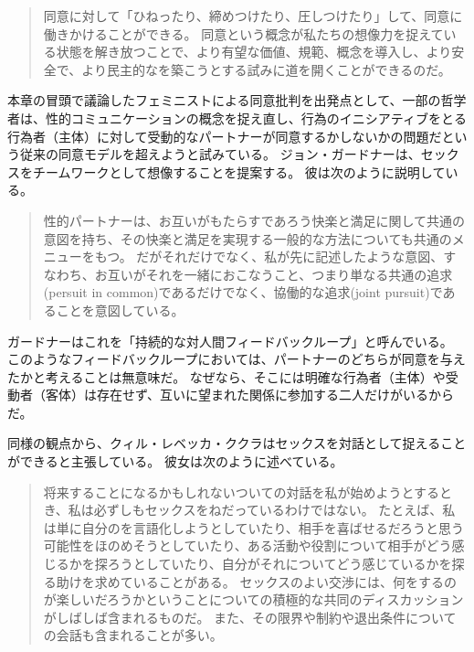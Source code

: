 \documentclass[paper=a4,book,openany]{jlreq}
\newcommand{\ig}[1]{}           %
\begin{document}
\begin{quote}
同意に対して「ひねったり、締めつけたり、圧しつけたり」して、同意に働きかけることができる。
同意という概念が私たちの想像力を捉えている状態を解き放つことで、より有望な価値、規範、概念を導入し、より安全で、より民主的なを築こうとする試みに道を開くことができるのだ。
\citep[p.3]{fischel18:screwconsent}
\end{quote}

本章の冒頭で議論したフェミニストによる同意批判を出発点として、一部の哲学者は、性的コミュニケーションの概念を捉え直し、行為のイニシアティブをとる行為者（主体）に対して受動的なパートナーが同意するかしないかの問題だという従来の同意モデルを超えようと試みている。
ジョン・ガードナーは、セックスをチームワークとして想像することを提案する。
彼は次のように説明している。

\begin{quote}
性的パートナーは、お互いがもたらすであろう快楽と満足に関して共通の意図を持ち、その快楽と満足を実現する一般的な方法についても共通のメニューをもつ。
だがそれだけでなく、私が先に記述したような意図、すなわち、お互いがそれを一緒におこなうこと、つまり単なる共通の追求(persuit in common)であるだけでなく、協働的な追求(joint pursuit)であることを意図している。
\citep[p.54]{gardner18:_oppos_rape}
\end{quote}

ガードナー\ig{Gardner}はこれを「持続的な対人間フィードバックループ」と呼んでいる\citep[p.55]{gardner18:_oppos_rape}。
このようなフィードバックループにおいては、パートナーのどちらが同意を与えたかと考えることは無意味だ。
なぜなら、そこには明確な行為者（主体）や受動者（客体）は存在せず、互いに望まれた関係に参加する二人だけがいるからだ。

同様の観点から、クィル・レベッカ・ククラはセックスを対話として捉えることができると主張している。
彼女は次のように述べている。

\begin{quote}
将来することになるかもしれないついての対話を私が始めようとするとき、私は必ずしもセックスをねだっているわけではない。
たとえば、私は単に自分のを言語化しようとしていたり、相手を喜ばせるだろうと思う可能性をほのめそうとしていたり、ある活動や役割について相手がどう感じるかを探ろうとしていたり、自分がそれについてどう感じているかを探る助けを求めていることがある。
セックスのよい交渉には、何をするのが楽しいだろうかということについての積極的な共同のディスカッションがしばしば含まれるものだ。
また、その限界や制約や退出条件についての会話も含まれることが多い。
\citep[p.76]{kukla18:_thats_what_she_said}
\end{quote}
\end{document}
